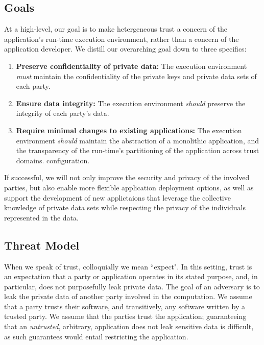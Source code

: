 

\subsection{Goals}
At a high-level, our goal is to make hetergeneous trust a concern
of the application's run-time execution environment, rather than a concern of
the application developer.
%
We distill our overarching goal down to three specifics:

\begin{enumerate}
\item \textbf{Preserve confidentiality of private data:} The execution
environment \emph{must} maintain the confidentiality of the private keys and
private data sets of each party.
\item \textbf{Ensure data integrity:} The execution environment \emph{should}
    preserve the integrity of each party's data.
\item \textbf{Require minimal changes to existing applications:}
    The execution environment \emph{should} maintain the abstraction of a monolithic
application, and the transparency of the run-time's partitioning of the
application across trust domains.
%
configuration.
\end{enumerate}

If successful, we will not only improve the security and privacy of the
involved parties, but also enable more flexible application deployment options,
as well as support the development of new applictaions that leverage the
collective knowledge of private data sets while respecting the privacy of the
individuals represented in the data.

\subsection{Threat Model}

When we speak of trust, colloquially we mean ``expect". 
%
In this setting, trust is an expectation that a party or application operates in
its stated purpose, and, in particular, does not purposefully leak private
data.
%
The goal of an adversary is to leak the private data of another party involved
in the computation.
%
We assume that a party trusts their software, and transitively, any software
written by a trusted party.
%
We assume that the parties trust the application; guaranteeing that an
\emph{untrusted}, arbitrary, application does not leak sensitive data is
difficult, as such guarantees would entail restricting the application.


